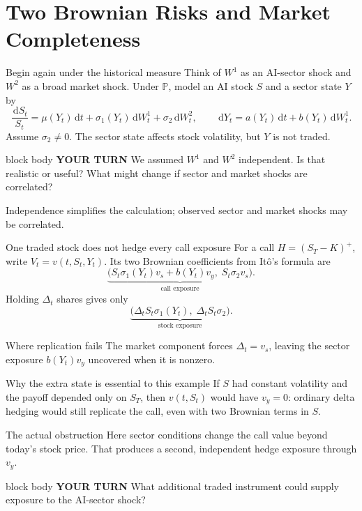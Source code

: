 \documentclass[handout,10pt,aspectratio=169]{beamer}
\newenvironment{pausebox}{\begin{beamercolorbox}[rounded=true,sep=0.8em,wd=\textwidth]{block body}
  \textbf{\color{CourseGold}YOUR TURN}\quad}{\end{beamercolorbox}}
\newcommand{\dd}{\,\mathrm d}
\newcommand{\Pp}{\mathbb P}
\newcommand{\1}{\mathbf 1}
\begin{document}
\section{Two Brownian Risks and Market Completeness}

\begin{frame}{Begin again under the historical measure}
Think of \(W^1\) as an AI-sector shock and \(W^2\) as a broad market shock.
Under \(\Pp\), model an AI stock \(S\) and a sector state \(Y\) by
\[
\frac{\dd S_t}{S_t}
=\mu(Y_t)\dd t+\sigma_1(Y_t)\dd W_t^1+\sigma_2\dd W_t^2,
\qquad
\dd Y_t=a(Y_t)\dd t+b(Y_t)\dd W_t^1.
\]
Assume \(\sigma_2\neq0\). The sector state affects stock volatility,
but \(Y\) is not traded.
\begin{pausebox}
We assumed \(W^1\) and \(W^2\) independent. Is that realistic or useful?
What might change if sector and market shocks are correlated?
\end{pausebox}

Independence simplifies the calculation; observed sector and market shocks
may be correlated.
\end{frame}

\begin{frame}{One traded stock does not hedge every call exposure}
For a call \(H=(S_T-K)^+\), write \(V_t=v(t,S_t,Y_t)\).
Its two Brownian coefficients from It\^o's formula are
\[
\underbrace{\bigl(S_t\sigma_1(Y_t)v_s+b(Y_t)v_y,\;
                   S_t\sigma_2v_s\bigr)}_{\text{call exposure}}.
\]
Holding \(\Delta_t\) shares gives only
\[
\underbrace{\bigl(\Delta_tS_t\sigma_1(Y_t),\;
                   \Delta_tS_t\sigma_2\bigr)}_{\text{stock exposure}}.
\]
\begin{alertblock}{Where replication fails}
The market component forces \(\Delta_t=v_s\), leaving the sector exposure
\(b(Y_t)v_y\) uncovered when it is nonzero.
\end{alertblock}
\end{frame}

\begin{frame}{Why the extra state is essential to this example}
If \(S\) had constant volatility and the payoff depended only on \(S_T\),
then \(v(t,S_t)\) would have \(v_y=0\): ordinary delta hedging would still
replicate the call, even with two Brownian terms in \(S\).
\begin{block}{The actual obstruction}
Here sector conditions change the call value beyond today's stock price.
That produces a second, independent hedge exposure through \(v_y\).
\end{block}
\begin{pausebox}
What additional traded instrument could supply exposure to the AI-sector
shock?
\end{pausebox}
\end{frame}
\end{document}
